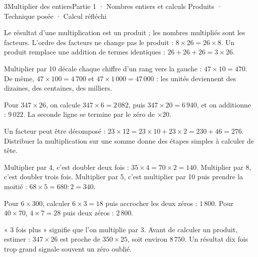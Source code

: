 \begin{ouverture}[calcul]{3}{Multiplier des entiers}{Partie 1 · Nombres entiers et calculs}
{Produits · Technique posée · Calcul réfléchi}
\end{ouverture}
\pagestyle{otMain}\essentiel\fontsize{11}{15}\selectfont
{}\label{cours-3-1}
\begin{definition}Le résultat d’une multiplication est un produit ; les nombres multipliés sont les facteurs. L’ordre des facteurs ne change pas le produit : $8\times26=26\times8$. Un produit remplace une addition de termes identiques : $26+26+26=3\times26$.\end{definition}
\label{fig-cours-3-1-cours-produit}

\begin{propriete}Multiplier par 10 décale chaque chiffre d’un rang vers la gauche : $47\times10=470$. De même, $47\times100=4\,700$ et $47\times1\,000=47\,000$ : les unités deviennent des dizaines, des centaines, des milliers.\end{propriete}
\begin{savoirfaire}Pour $347\times26$, on calcule $347\times6=2\,082$, puis $347\times20=6\,940$, et on additionne : $9\,022$. La seconde ligne se termine par le zéro de $\times20$.\end{savoirfaire}
\clearpage
{}\label{cours-3-2}
\begin{propriete}Un facteur peut être décomposé : $23\times12=23\times10+23\times2=230+46=276$. Distribuer la multiplication sur une somme donne des étapes simples à calculer de tête.\end{propriete}
\begin{exemple}Multiplier par 4, c’est doubler deux fois : $35\times4=70\times2=140$. Multiplier par 8, c’est doubler trois fois. Multiplier par 5, c’est multiplier par 10 puis prendre la moitié : $68\times5=680:2=340$.\end{exemple}
\begin{savoirfaire}Pour $6\times300$, calculer $6\times3=18$ puis accrocher les deux zéros : $1\,800$. Pour $40\times70$, $4\times7=28$ puis deux zéros : $2\,800$.\end{savoirfaire}
\begin{attention}« 3 fois plus » signifie que l’on multiplie par 3. Avant de calculer un produit, estimer : $347\times26$ est proche de $350\times25$, soit environ $8\,750$. Un résultat dix fois trop grand signale souvent un zéro oublié.\end{attention}

